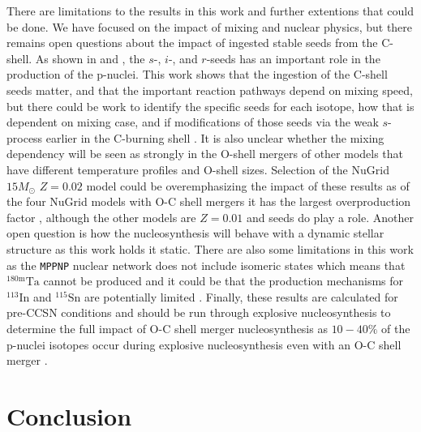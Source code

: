 There are limitations to the results in this work and further extentions that could be done. 
We have focused on the impact of mixing and nuclear physics, but there remains open questions about the impact of ingested stable seeds from the C-shell. 
As shown in \cite{travaglioTestingRoleSNe2015} and \cite{battinoHeavyElementsNucleosynthesis2020}, the $s$-, $i$-, and $r$-seeds has an important role in the production of the p-nuclei.
This work shows that the ingestion of the C-shell seeds matter, and that the important reaction pathways depend on mixing speed, but there could be work to identify the specific seeds for each isotope, how that is dependent on mixing case, and if modifications of those seeds via the weak $s$-process earlier in the C-burning shell \citep{pignatariWEAKSPROCESSMASSIVE2010}.
It is also unclear whether the mixing dependency will be seen as strongly in the O-shell mergers of other models that have different temperature profiles and O-shell sizes.
Selection of the NuGrid $15M_\odot$ $Z=0.02$ model could be overemphasizing the impact of these results as of the four NuGrid models with O-C shell mergers it has the largest overproduction factor \citep{ritterConvectivereactiveNucleosynthesisSc2018}, although the other models are $Z=0.01$ and seeds do play a role.
Another open question is how the nucleosynthesis will behave with a dynamic stellar structure as this work holds it static.
There are also some limitations in this work as the \texttt{MPPNP} nuclear network does not include isomeric states which means that  $^{180\mathrm{m}}\mathrm{Ta}$ cannot be produced and it could be that the production mechanisms for $^{113}\mathrm{In}$ and $^{115}\mathrm{Sn}$ are potentially limited \citep{dillmannPProcessSimulationsModified2008}.
Finally, these results are calculated for pre-CCSN conditions and should be run through explosive nucleosynthesis to determine the full impact of O-C shell merger nucleosynthesis as $10-40\%$ of the p-nuclei isotopes occur during explosive nucleosynthesis even with an O-C shell merger \citep{robertiGprocessNucleosynthesisCorecollapse2023}.

\section{Conclusion} \label{sec:conclusion}

